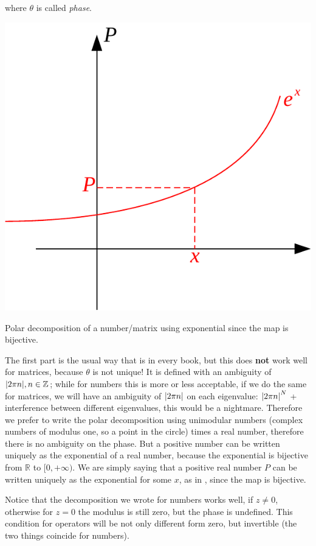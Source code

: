 \documentclass[../main.tex]{subfiles}
\begin{document}
where $\theta$ is called \textit{phase}. \begin{marginfigure}
	\includegraphics[width=1\linewidth]{images/polar_dec.pdf}
	\caption{Polar decomposition of a number/matrix using exponential since the map is bijective.}
\end{marginfigure}The first part is the usual way that is in every book, but this does \textbf{not} work well for matrices, because $\theta$ is not unique! It is defined with an ambiguity of $\abs{2\pi n}, n\in\mathbb{Z}$; while for numbers this is more or less acceptable, if we do the same for matrices, we will have an ambiguity of $\abs{2\pi n}$ on each eigenvalue: $\abs{2\pi n}^N$ + interference between different eigenvalues, this would be a nightmare. Therefore we prefer to write the polar decomposition using unimodular numbers (complex numbers of modulus one, so a point in the circle) times a real number, therefore there is no ambiguity on the phase. But a positive number can be written uniquely as the exponential of a real number, because the exponential is bijective from $\mathbb{R}$ to $[0,+\infty)$. We are simply saying that a positive real number $P$ can be written uniquely as the exponential for some $x$, as in , since the map is bijective.

Notice that the decomposition we wrote for numbers works well, if $z\neq 0$, otherwise for $z=0$ the modulus is still zero, but the phase is undefined. This condition for operators will be not only different form zero, but invertible (the two things coincide for numbers).
\end{document}
